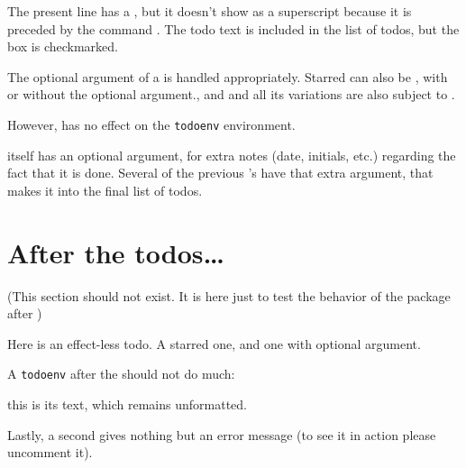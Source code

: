 \documentclass[12pt]{article}
\providecommand\cs[1]{\texttt{\string#1}}
\begin{document}
The present line has a \cs{\todo},\done{} but it doesn't show as a superscript because it is preceded by the command \cs{\done}. The todo text is included in the list of todos, but the box is checkmarked.

The optional argument of a \cs{\done}\cs{\todo} is handled appropriately.\done{} Starred \cs{\todo*} can also be \cs{\done},\done{} with or without the optional argument.\done{}, and \cs{\Todo} and all its variations are also subject to \cs{\done}.\done[FG]\done[HI]\done{}\done{}

However, \cs{\done} has no effect on the \texttt{todoenv} environment.

\cs{\done} itself has an optional argument, for extra notes (date, initials, etc.) regarding the fact that it is done. Several of the previous \cs{\done}\cs{\todo}'s have that extra argument, that makes it into the final list of todos.
\todos

\newpage
\section{After the todos\dots}

(This section should not exist. It is here just to test the behavior of the package after \cs{\todos})

Here is an effect-less todo. A starred one, and one with optional argument.

A \texttt{todoenv} after the \cs{\todos} should not do much: \begin{todoenv}this is its text, which remains unformatted.\end{todoenv}


Lastly, a second \cs{\todos} gives nothing but an error message (to see it in action please uncomment it).%
\end{document}
